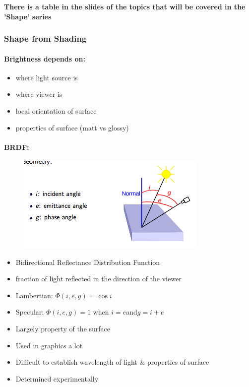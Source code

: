 \documentclass[paper=a4, fontsize=11pt]{article} %
\numberwithin{equation}{section} %
\numberwithin{figure}{section} %
\numberwithin{table}{section} %
\begin{document}
\textbf{There is a table in the slides of the topics that will be covered in the 'Shape' series}

\subsubsection{Shape from Shading}

\paragraph{Brightness depends on:}
\begin{itemize}
\item where light source is
\item where viewer is
\item local orientation of surface
\item properties of surface (matt vs glossy)
\end{itemize}

\paragraph{BRDF: }

\begin{figure}[h]
    \centering
\includegraphics{images/brdf}
    \label{fig:brdf}
\end{figure}
\begin{itemize}
\item Bidirectional Reflectance Distribution Function
\item fraction of light reflected in the direction of the viewer
\item Lambertian: $\Phi(i,e,g) = \cos i$
\item Specular: $\Phi(i,e,g) = 1 $ when $ i = e $and$ g = i + e $
\item Largely property of the surface
\item Used in graphics a lot
\item Difficult to establish wavelength of light \& properties of surface
\item Determined experimentally
\end{itemize}
\end{document}
